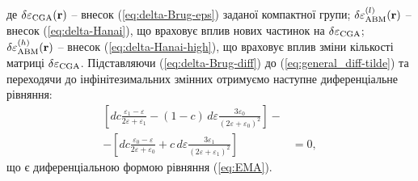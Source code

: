 \documentclass[14pt,twoside]{vakthesis}
\begin{document}
де $\delta\varepsilon_{\rm CGA} ({\bf r})$ -- внесок (\ref{eq:delta-Brug-eps}) заданої компактної групи; $\delta\varepsilon_{\rm ABM}^{(l)} ({\bf r})$ -- внесок (\ref{eq:delta-Hanai}), що враховує вплив нових частинок на $\delta{\varepsilon}_{\rm CGA}$; $\delta\varepsilon_{\rm ABM}^{(h)} ({\bf r})$ -- внесок (\ref{eq:delta-Hanai-high}), що враховує вплив зміни кількості матриці  $\delta\varepsilon_{\rm CGA}$.
Підставляючи (\ref{eq:delta-Brug-diff}) до (\ref{eq:general_diff-tilde}) та переходячи до інфінітезимальних змінних отримуємо наступне диференціальне рівняння:
\begin{equation}\label{eq:Bruggeman-diff-general}
\begin{split}
\left[ d c \frac{\varepsilon_1 - \varepsilon}{2\varepsilon + \varepsilon_1} - (1 - c) \, d\varepsilon \frac{3\varepsilon_0}{(2\varepsilon + \varepsilon_0)^2} \right] -& \\
- \left[  d c \frac{\varepsilon_0 - \varepsilon}{2\varepsilon + \varepsilon_0}
+ c \, d\varepsilon \frac{3\varepsilon_1}{(2\varepsilon + \varepsilon_1)^2} \right] &= 0,
\end{split}
\end{equation}
що є диференціальною формою рівняння (\ref{eq:EMA}). 
\end{document}
